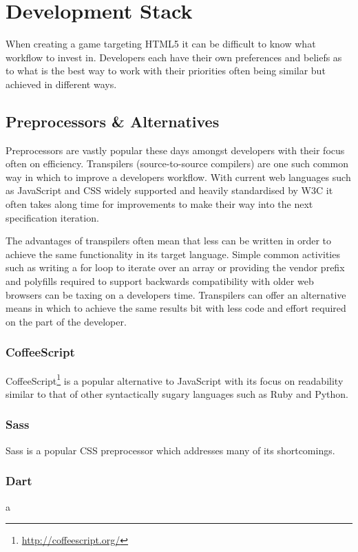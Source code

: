 \documentclass[final]{cmpreport}
\begin{document}
\section{Development Stack}
When creating a game targeting HTML5 it can be difficult to know what workflow to invest in. Developers each have their own preferences and beliefs as to what is the best way to work with their priorities often being similar but achieved in different ways.

\subsection{Preprocessors \& Alternatives}
Preprocessors are vastly popular these days amongst developers with their focus often on efficiency. Transpilers (source-to-source compilers) are one such common way in which to improve a developers workflow. With current web languages such as JavaScript and CSS widely supported and heavily standardised by W3C it often takes along time for improvements to make their way into the next specification iteration.

The advantages of transpilers often mean that less can be written in order to achieve the same functionality in its target language. Simple common activities such as writing a for loop to iterate over an array or providing the vendor prefix and polyfills required to support backwards compatibility with older web browsers can be taxing on a developers time. Transpilers can offer an alternative means in which to achieve the same results bit with less code and effort required on the part of the developer.

\subsubsection{CoffeeScript}
CoffeeScript\footnote{\url{http://coffeescript.org/}} is a popular alternative to JavaScript with its focus on readability similar to that of other syntactically sugary \cite{ESR} languages such as Ruby and Python.

\subsubsection{Sass}
Sass is a popular CSS preprocessor which addresses many of its shortcomings.

\subsubsection{Dart}
a
\end{document}
